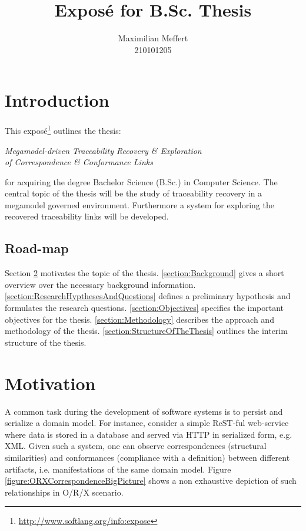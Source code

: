 \documentclass[runningheads,a4paper]{llncs}
\title{Exposé for B.Sc. Thesis}
\subtitle{\thesis}
\author{Maximilian Meffert\\210101205}
\institute{University of Koblenz-Landau}
\newcommand{\thesis}{Megamodel-driven Traceability Recovery \& Exploration\\of Correspondence \& Conformance Links}
\begin{document}
\maketitle
%


\section{Introduction}
This exposé\footnote{\url{http://www.softlang.org/info:expose}} outlines the thesis:
\begin{center}
\it
\thesis
\end{center}
for acquiring the degree Bachelor Science (B.Sc.) in Computer Science.
The central topic of the thesis will be the study of traceability recovery in a megamodel governed environment.
Furthermore a system for exploring the recovered traceability links will be developed.

\subsection{Road-map}
Section \ref{section:Motivation} motivates the topic of the thesis.
\ref{section:Background} gives a short overview over the necessary background information.
\ref{section:ResearchHypthesesAndQuestions} defines a preliminary hypothesis and formulates the research questions.
\ref{section:Objectives} specifies the important objectives for the thesis.
\ref{section:Methodology} describes the approach and methodology of the thesis.
\ref{section:StructureOfTheThesis} outlines the interim structure of the thesis.


\section{Motivation}
\label{section:Motivation}
A common task during the development of software systems is to persist and serialize a domain model.
For instance, consider a simple ReST-ful web-service where data is stored in a database and served via HTTP in serialized form, e.g. XML.
Given such a system, one can observe correspondences (structural similarities) and conformances (compliance with a definition) between different artifacts, i.e. manifestations of the same domain model.
Figure \ref{figure:ORXCorrespondenceBigPicture} shows a non exhaustive depiction of such relationships in O/R/X scenario.
\end{document}
